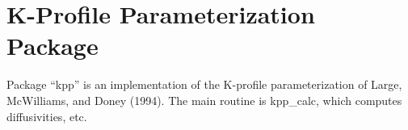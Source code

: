 
\chapter{K-Profile Parameterization Package}
  
Package ``kpp'' is an implementation of the K-profile parameterization of
Large, McWilliams, and Doney (1994).  The main routine is kpp\_calc, which
computes diffusivities, etc.

